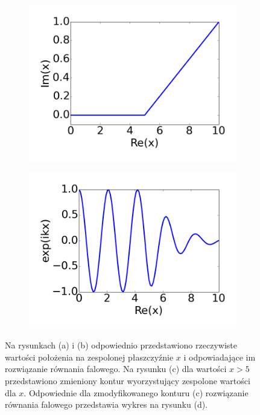 \begin{figure}[tb]
	\begin{subfigure}{0.45\textwidth}
		\includegraphics[width=\textwidth]{images/pml/complex-x.png}
		\caption{}
		\label{fig:complex-contour}
	\end{subfigure}
	\begin{subfigure}{0.45\textwidth}
		\includegraphics[width=\textwidth]{images/pml/complex-x-wave.png}
		\caption{}
		\label{fig:absorbing-region}
	\end{subfigure}

	\caption{Na rysunkach (a) i (b) odpowiednio przedstawiono rzeczywiste wartości położenia na zespolonej płaszczyźnie $x$ i odpowiadające im rozwiązanie równania falowego. Na rysunku (c) dla wartości $x>5$ przedstawiono zmieniony kontur wyorzystujący zespolone wartości dla $x$. Odpowiednie dla zmodyfikowanego konturu (c)  rozwiązanie równania falowego przedstawia wykres na rysunku (d).}
	\label{fig:var-transform}
\end{figure}


